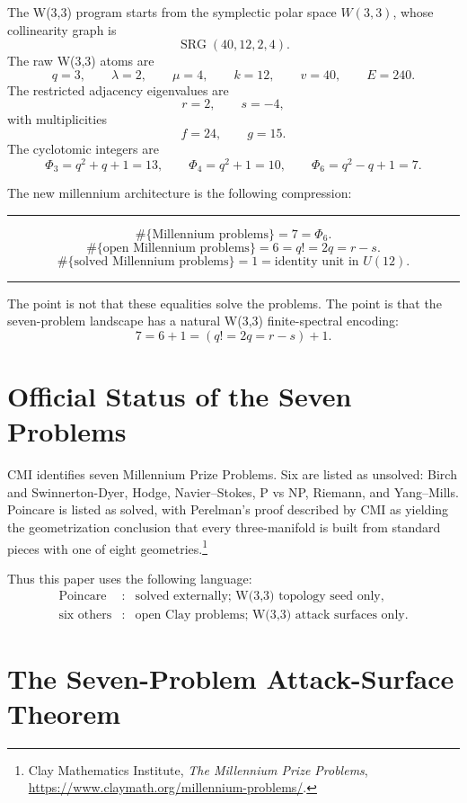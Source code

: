 \documentclass[11pt]{article}
\theoremstyle{definition}
\newcommand{\W}{W(3,3)}
\newcommand{\PhiThree}{\Phi_3}
\newcommand{\PhiFour}{\Phi_4}
\newcommand{\PhiSix}{\Phi_6}
\newenvironment{keybox}{%
  \begin{center}\begin{minipage}{0.94\linewidth}\color{darkblue}\hrule\vspace{0.65em}
}{%
  \vspace{0.65em}\hrule\end{minipage}\end{center}
}
\begin{document}
The W(3,3) program starts from the symplectic polar space \(\W\), whose collinearity graph is
\[
  \operatorname{SRG}(40,12,2,4).
\]
The raw W(3,3) atoms are
\[
  q=3,
  \qquad \lambda=2,
  \qquad \mu=4,
  \qquad k=12,
  \qquad v=40,
  \qquad E=240.
\]
The restricted adjacency eigenvalues are
\[
  r=2,\qquad s=-4,
\]
with multiplicities
\[
  f=24,
  \qquad g=15.
\]
The cyclotomic integers are
\[
  \PhiThree=q^2+q+1=13,
  \qquad \PhiFour=q^2+1=10,
  \qquad \PhiSix=q^2-q+1=7.
\]

The new millennium architecture is the following compression:

\begin{keybox}
\[
\boxed{
\#\{\text{Millennium problems}\}=7=\PhiSix.
}
\]
\[
\boxed{
\#\{\text{open Millennium problems}\}=6=q!=2q=r-s.
}
\]
\[
\boxed{
\#\{\text{solved Millennium problems}\}=1=\text{identity unit in }U(12).
}
\]
\end{keybox}

The point is not that these equalities solve the problems.  The point is that the seven-problem landscape has a natural W(3,3) finite-spectral encoding:
\[
  7 = 6+1 = (q!=2q=r-s)+1.
\]

\section{Official Status of the Seven Problems}

CMI identifies seven Millennium Prize Problems.  Six are listed as unsolved: Birch and Swinnerton-Dyer, Hodge, Navier--Stokes, P vs NP, Riemann, and Yang--Mills.  Poincare is listed as solved, with Perelman's proof described by CMI as yielding the geometrization conclusion that every three-manifold is built from standard pieces with one of eight geometries.\footnote{Clay Mathematics Institute, \emph{The Millennium Prize Problems}, \url{https://www.claymath.org/millennium-problems/}.}

Thus this paper uses the following language:
\[
\begin{array}{lll}
\text{Poincare} &:& \text{solved externally; W(3,3) topology seed only},\\[0.25em]
\text{six others} &:& \text{open Clay problems; W(3,3) attack surfaces only}.
\end{array}
\]

\section{The Seven-Problem Attack-Surface Theorem}
\end{document}

